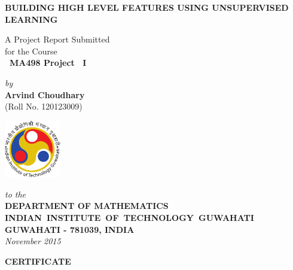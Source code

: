 \documentclass[12pt,a4paper]{report}
\theoremstyle{plain}
\theoremstyle{definition}
\theoremstyle{remark}
\begin{document}


\begin{titlepage}
\enlargethispage{3cm}

\begin{center}

\vspace*{-2cm}

\textbf{\Large BUILDING HIGH LEVEL FEATURES USING UNSUPERVISED LEARNING}

\vfill

 A Project Report Submitted \\
for the Course \\[1cm]

{\bf\Large\ MA498 Project ~I }\\[.1in]

 \vfill

{\large \emph{by}}\\[5pt]
{\large\bf {Arvind Choudhary}}\\[5pt]
{\large (Roll No. 120123009)}

\vfill
\includegraphics[height=2.5cm]{iitglogo}

\vspace*{0.5cm}

{\em\large to the}\\[10pt]
{\bf\large DEPARTMENT OF MATHEMATICS} \\[5pt]
{\bf\large \mbox{INDIAN INSTITUTE OF TECHNOLOGY GUWAHATI}}\\[5pt]
{\bf\large GUWAHATI - 781039, INDIA}\\[10pt]
{\it\large November 2015}
\end{center}

\end{titlepage}

\clearpage

 \setcounter{page}{2}
\begin{center}
{\Large{\bf{CERTIFICATE}}}
\end{center}
\end{document}
